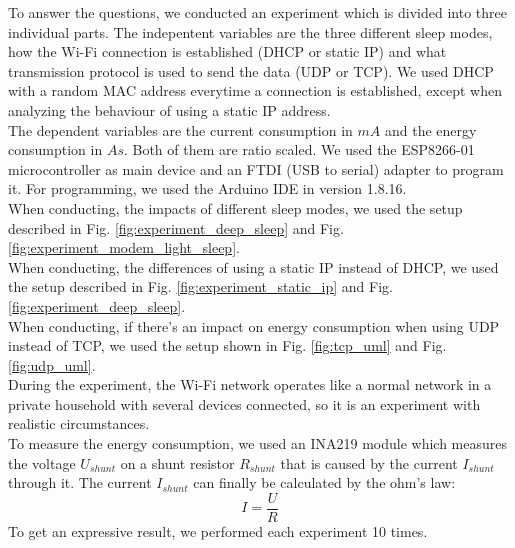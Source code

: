 To answer the questions, we conducted an experiment which is divided into three individual parts.
The indepentent variables are the three different sleep modes, how the Wi-Fi connection is established (DHCP or static IP) and what transmission protocol is used to send the data (UDP or TCP).
We used DHCP with a random MAC address everytime a connection is established, except when analyzing the behaviour of using a static IP address.\\
The dependent variables are the current consumption in $mA$ and the energy consumption in $As$. Both of them are ratio scaled.
We used the ESP8266-01 microcontroller as main device and an FTDI (USB to serial) adapter to program it. 
For programming, we used the Arduino IDE in version 1.8.16.\\
When conducting, the impacts of different sleep modes, we used the setup described in Fig. \ref{fig:experiment_deep_sleep} and Fig. \ref{fig:experiment_modem_light_sleep}.\\
When conducting, the differences of using a static IP instead of DHCP, we used the setup described in Fig. \ref{fig:experiment_static_ip} and Fig. \ref{fig:experiment_deep_sleep}.\\
When conducting, if there's an impact on energy consumption when using UDP instead of TCP, we used the setup shown in Fig. \ref{fig:tcp_uml} and Fig. \ref{fig:udp_uml}.\\
During the experiment, the Wi-Fi network operates like a normal network in a private household with several devices connected, so it is an experiment with realistic circumstances.\\

To measure the energy consumption, we used an INA219 module which measures the voltage $U_{shunt}$ on a shunt resistor $R_{shunt}$ that is caused by the current $I_{shunt}$ through it.
The current $I_{shunt}$ can finally be calculated by the ohm's law:
\begin{equation*}
    I = \frac{U}{R}
\end{equation*}
To get an expressive result, we performed each experiment 10 times.





